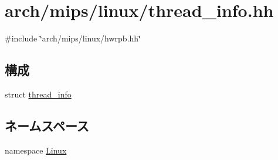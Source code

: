 \hypertarget{thread__info_8hh}{
\section{arch/mips/linux/thread\_\-info.hh}
\label{thread__info_8hh}
}
{\ttfamily \#include \char`\"{}arch/mips/linux/hwrpb.hh\char`\"{}}\par
\subsection*{構成}
\begin{DoxyCompactItemize}
\item 
struct \hyperlink{structLinux_1_1thread__info}{thread\_\-info}
\end{DoxyCompactItemize}
\subsection*{ネームスペース}
\begin{DoxyCompactItemize}
\item 
namespace \hyperlink{namespaceLinux}{Linux}
\end{DoxyCompactItemize}
